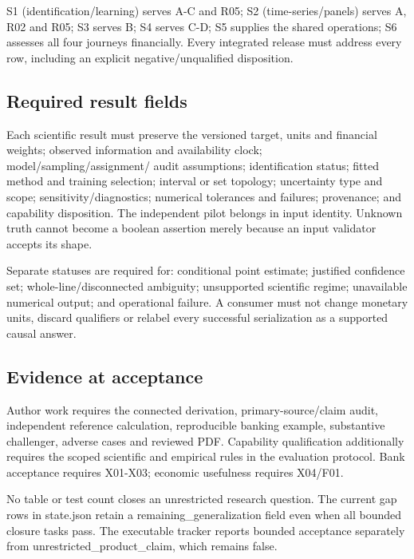 \documentclass[
  11pt,
  a4paper,
]{article}
\begin{document}
S1 (identification/learning) serves A-C and R05; S2 (time-series/panels)
serves A, R02 and R05; S3 serves B; S4 serves C-D; S5 supplies the
shared operations; S6 assesses all four journeys financially. Every
integrated release must address every row, including an explicit
negative/unqualified disposition.

\hypertarget{required-result-fields}{%
\subsection{Required result fields}\label{required-result-fields}}

Each scientific result must preserve the versioned target, units and
financial weights; observed information and availability clock;
model/sampling/assignment/ audit assumptions; identification status;
fitted method and training selection; interval or set topology;
uncertainty type and scope; sensitivity/diagnostics; numerical
tolerances and failures; provenance; and capability disposition. The
independent pilot belongs in input identity. Unknown truth cannot become
a boolean assertion merely because an input validator accepts its shape.

Separate statuses are required for: conditional point estimate;
justified confidence set; whole-line/disconnected ambiguity; unsupported
scientific regime; unavailable numerical output; and operational
failure. A consumer must not change monetary units, discard qualifiers
or relabel every successful serialization as a supported causal answer.

\hypertarget{evidence-at-acceptance}{%
\subsection{Evidence at acceptance}\label{evidence-at-acceptance}}

Author work requires the connected derivation, primary-source/claim
audit, independent reference calculation, reproducible banking example,
substantive challenger, adverse cases and reviewed PDF. Capability
qualification additionally requires the scoped scientific and empirical
rules in the evaluation protocol. Bank acceptance requires X01-X03;
economic usefulness requires X04/F01.

No table or test count closes an unrestricted research question. The
current gap rows in state.json retain a remaining\_generalization field
even when all bounded closure tasks pass. The executable tracker reports
bounded acceptance separately from unrestricted\_product\_claim, which
remains false.
\end{document}
